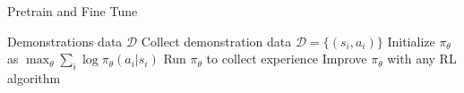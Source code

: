 \begin{algorithm}[t!]
\caption{Pretrain and Fine Tune}
\begin{algorithmic}[1]
\label{alg:pretrain}
\REQUIRE Demonstrations data $\mathcal{D}$
\STATE Collect demonstration data $\mathcal{D} = \{(s_i,a_i)\}$
\STATE Initialize $\pi_\theta$ as $\max_\theta\sum_i\log\pi_\theta(a_i|s_i)$
\STATE Run $\pi_\theta$ to collect experience
\STATE Improve $\pi_\theta$ with any RL algorithm
\ENDWHILE
\end{algorithmic}
\end{algorithm}